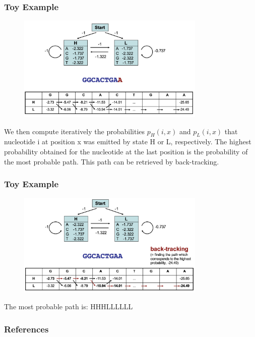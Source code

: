 \documentclass{beamer}
\begin{document}
\begin{frame}
    \frametitle{Toy Example}
    
    \begin{figure}[T]
        \includegraphics[width=0.8\textwidth]{img/12.png}
        \end{figure}
        We then compute iteratively the probabilities $p_H(i,x)$ and $p_L(i,x)$ that nucleotide i at position x was emitted by state H or L, respectively. 
        The highest probability obtained for the nucleotide at the last position is the probability of the most probable path. 
        This path can be retrieved by back-tracking.

    \end{frame}
\begin{frame}
    \frametitle{Toy Example}
    
    \begin{figure}[T]
        \includegraphics[width=0.8\textwidth]{img/13.png}
        \end{figure}
        The most probable path is: \color{red}HHHLLLLLL

    \end{frame}
\begin{frame}[t, allowframebreaks]
    \frametitle{References}
    
    
    \end{frame}
\end{document}
